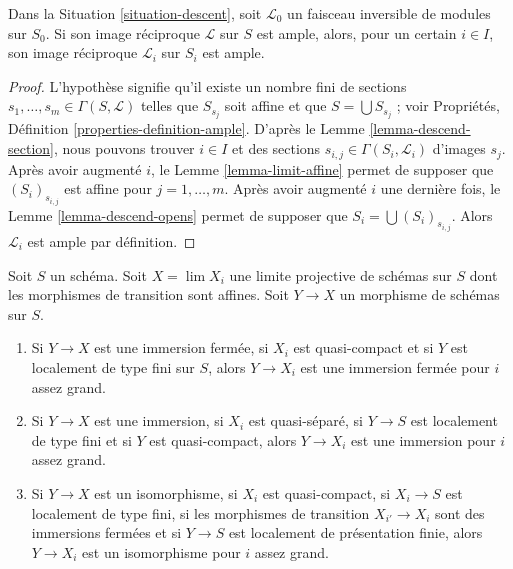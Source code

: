 \begin{lemma}
\label{lemma-limit-ample}
Dans la Situation \ref{situation-descent}, soit $\mathcal{L}_0$ un faisceau
inversible de modules sur $S_0$. Si son image réciproque $\mathcal{L}$ sur
$S$ est ample, alors, pour un certain $i \in I$, son image réciproque
$\mathcal{L}_i$ sur $S_i$ est ample.
\end{lemma}

\begin{proof}
L'hypothèse signifie qu'il existe un nombre fini de sections
$s_1, \ldots, s_m \in \Gamma(S, \mathcal{L})$ telles que $S_{s_j}$ soit
affine et que $S = \bigcup S_{s_j}$ ; voir Propriétés,
Définition \ref{properties-definition-ample}. D'après le
Lemme \ref{lemma-descend-section}, nous pouvons trouver $i \in I$ et des
sections $s_{i, j} \in \Gamma(S_i, \mathcal{L}_i)$ d'images $s_j$.
Après avoir augmenté $i$, le Lemme \ref{lemma-limit-affine} permet de
supposer que $(S_i)_{s_{i, j}}$ est affine pour $j = 1, \ldots, m$.
Après avoir augmenté $i$ une dernière fois, le
Lemme \ref{lemma-descend-opens} permet de supposer que
$S_i = \bigcup (S_i)_{s_{i, j}}$. Alors $\mathcal{L}_i$ est ample par
définition.
\end{proof}

\begin{lemma}
\label{lemma-finite-type-eventually-closed}
Soit $S$ un schéma. Soit $X = \lim X_i$ une limite projective de schémas sur
$S$ dont les morphismes de transition sont affines. Soit $Y \to X$ un
morphisme de schémas sur $S$.
\begin{enumerate}
\item Si $Y \to X$ est une immersion fermée, si $X_i$ est quasi-compact et
si $Y$ est localement de type fini sur $S$, alors $Y \to X_i$ est une
immersion fermée pour $i$ assez grand.
\item Si $Y \to X$ est une immersion, si $X_i$ est quasi-séparé, si
$Y \to S$ est localement de type fini et si $Y$ est quasi-compact, alors
$Y \to X_i$ est une immersion pour $i$ assez grand.
\item Si $Y \to X$ est un isomorphisme, si $X_i$ est quasi-compact, si
$X_i \to S$ est localement de type fini, si les morphismes de transition
$X_{i'} \to X_i$ sont des immersions fermées et si $Y \to S$ est localement
de présentation finie, alors $Y \to X_i$ est un isomorphisme pour $i$ assez
grand.
\end{enumerate}
\end{lemma}

